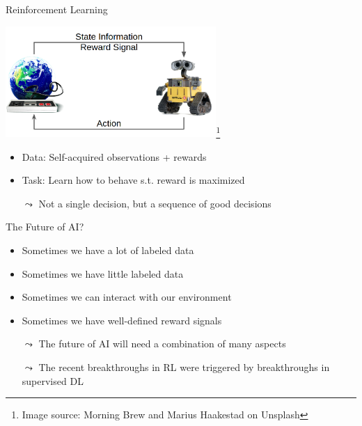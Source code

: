 \documentclass[aspectratio=169]{../latex_main/tntbeamer}  %
\begin{document}
\begin{frame}[c]{Reinforcement Learning}
	
		\centering
	\includegraphics[width=0.6\textwidth]{images/rl_comic.png}\footnote{Image source: Morning Brew and Marius Haakestad on Unsplash}
	
	\bigskip
	
	\begin{itemize}
		\item Data: Self-acquired observations + rewards
		\item Task: Learn how to behave s.t. reward is maximized
		\item[$\leadsto$] Not a single decision, but a sequence of good decisions
	\end{itemize}	
	
	
\end{frame}
\begin{frame}[c]{The Future of AI?}
	
	\begin{itemize}
		\item Sometimes we have a lot of labeled data
		\item Sometimes we have little labeled data
		\item Sometimes we can interact with our environment
		\item Sometimes we have well-defined reward signals
		\bigskip
		\pause
		\item[$\leadsto$] The future of AI will need a combination of many aspects
		\item[$\leadsto$] The recent breakthroughs in RL were triggered by breakthroughs in supervised DL  
	\end{itemize}



\end{frame}
\end{document}
